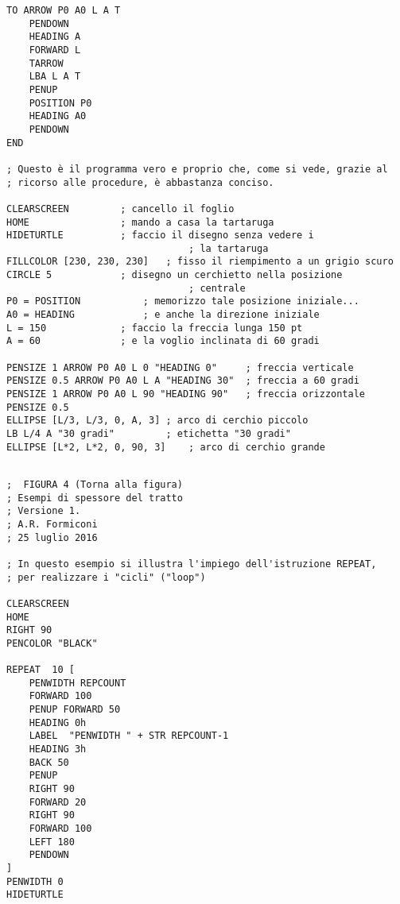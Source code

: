 \begin{lstlisting}[frame=single]
TO ARROW P0 A0 L A T
	PENDOWN
	HEADING A
	FORWARD L
	TARROW
	LBA L A T
	PENUP
	POSITION P0
	HEADING A0
	PENDOWN
END

; Questo è il programma vero e proprio che, come si vede, grazie al 
; ricorso alle procedure, è abbastanza conciso.

CLEARSCREEN			; cancello il foglio
HOME				; mando a casa la tartaruga
HIDETURTLE			; faccio il disegno senza vedere i
                                ; la tartaruga
FILLCOLOR [230, 230, 230]	; fisso il riempimento a un grigio scuro
CIRCLE 5			; disegno un cerchietto nella posizione 
                                ; centrale 
P0 = POSITION			; memorizzo tale posizione iniziale...
A0 = HEADING			; e anche la direzione iniziale
L = 150				; faccio la freccia lunga 150 pt
A = 60				; e la voglio inclinata di 60 gradi

PENSIZE 1 ARROW P0 A0 L 0 "HEADING 0"	  ; freccia verticale
PENSIZE 0.5 ARROW P0 A0 L A "HEADING 30"  ; freccia a 60 gradi
PENSIZE 1 ARROW P0 A0 L 90 "HEADING 90"	  ; freccia orizzontale
PENSIZE 0.5	
ELLIPSE [L/3, L/3, 0, A, 3]	; arco di cerchio piccolo
LB L/4 A "30 gradi" 		; etichetta "30 gradi"
ELLIPSE [L*2, L*2, 0, 90, 3] 	; arco di cerchio grande

\end{lstlisting}

\vskip 1cm


\lstset{extendedchars=true, basicstyle=\scriptsize} 
\begin{lstlisting}[frame=single]  % Start your code-block

;  FIGURA 4 (Torna alla figura)
; Esempi di spessore del tratto
; Versione 1.
; A.R. Formiconi
; 25 luglio 2016

; In questo esempio si illustra l'impiego dell'istruzione REPEAT, 
; per realizzare i "cicli" ("loop")

CLEARSCREEN
HOME
RIGHT 90
PENCOLOR "BLACK"

REPEAT  10 [
	PENWIDTH REPCOUNT
	FORWARD 100
	PENUP FORWARD 50
	HEADING 0h
	LABEL  "PENWIDTH " + STR REPCOUNT-1 
	HEADING 3h
	BACK 50
	PENUP
	RIGHT 90
	FORWARD 20
	RIGHT 90
	FORWARD 100
	LEFT 180
	PENDOWN
]
PENWIDTH 0
HIDETURTLE

\end{lstlisting}

\vskip 1cm


